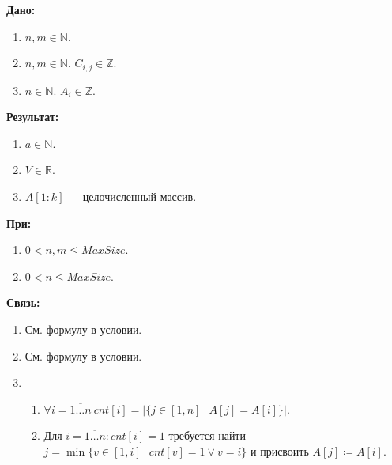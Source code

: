 \textbf{Дано:}
\begin{enumerate}
    \item \(n, m \in \mathbb{N}\).
    \item \(n, m \in \mathbb{N}\). \(C_{i,j} \in \mathbb{Z}\).
    \item \(n \in \mathbb{N}\). \(A_i \in \mathbb{Z}\).    
\end{enumerate}

\noindent
\textbf{Результат:}
\begin{enumerate}
   \item \(a \in \mathbb{N}\). 
   \item \(V \in \mathbb{R}\).
   \item \(A[1{:}k]\) --- целочисленный массив.    
\end{enumerate} 

\noindent
\textbf{При:} 
\begin{enumerate}\addtocounter{enumi}{1}
    \item \(0 < n, m \leq  MaxSize\).
    \item \(0 < n \leq MaxSize\). 
\end{enumerate}

\noindent
\textbf{Связь:} 
\begin{enumerate}
    \item См. формулу в условии.
    \item См. формулу в условии.
    \item 
    \begin{enumerate}
        \item \(\forall i = \overline{1\dots n}\ cnt[i] = \left\vert \{j \in {[1, n]}\ |\ A[j] = A[i] \} \right\vert \).
        \item Для \(i = \overline{1 \dots n}: cnt[i] = 1\) требуется найти \(j = \min\{v \in [1, i]\ |\ cnt[v] = 1 \lor v = i\}\) и присвоить \(A[j] \coloneqq A[i]\).
    \end{enumerate}
\end{enumerate}